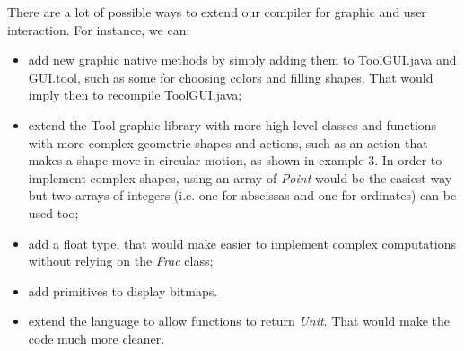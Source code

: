 There are a lot of possible ways to extend our compiler for graphic and user interaction.
For instance, we can:
\begin{itemize}
\item{}
add new graphic native methods by simply adding them to ToolGUI.java and GUI.tool, such as some for choosing colors and filling shapes. That would imply then to recompile ToolGUI.java;
\item{}
extend the Tool graphic library with more high-level classes and functions with more complex geometric shapes and actions, such as an action that makes a shape move in circular motion, as shown in example 3. In order to implement complex shapes, using an array of \textit{Point} would be the easiest way but two arrays of integers (i.e. one for abscissas and one for ordinates) can be used too;
\item{}
add a float type, that would make easier to implement complex computations without relying on the \textit{Frac} class;
\item{}
add primitives to display bitmaps.
\item{}
extend the language to allow functions to return \textit{Unit}. That would make the code much more cleaner.
\end{itemize}